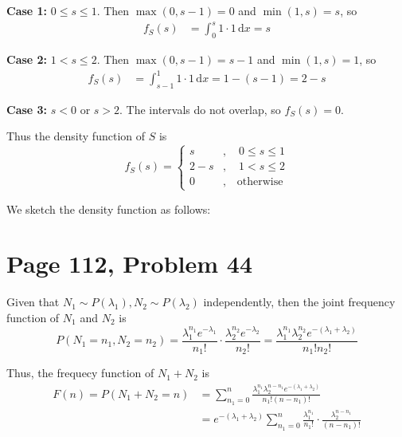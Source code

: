 \documentclass[a4paper, UTF-8]{article}
\theoremstyle{plain}
\begin{document}
\textbf{Case 1:} $0 \leq s \leq 1$. Then $\max(0, s-1) = 0$ and $\min(1, s) = s$, so
\begin{align*}
f_S(s) &= \int_{0}^{s} 1 \cdot 1 \, \mathrm{d}x = s
\end{align*}

\textbf{Case 2:} $1 < s \leq 2$. Then $\max(0, s-1) = s-1$ and $\min(1, s) = 1$, so
\begin{align*}
f_S(s) &= \int_{s-1}^{1} 1 \cdot 1 \, \mathrm{d}x = 1 - (s-1) = 2 - s
\end{align*}

\textbf{Case 3:} $s < 0$ or $s > 2$. The intervals do not overlap, so $f_S(s) = 0$.

Thus the density function of $S$ is
$$
f_S(s) = \begin{cases}
s &, \quad 0 \leq s \leq 1 \\
2 - s &, \quad 1 < s \leq 2 \\
0 &, \quad \text{otherwise}
\end{cases}
$$

We sketch the density function as follows:

\begin{center}
\end{center}

\section{Page 112, Problem 44}

Given that $N_1 \sim P(\lambda_1), N_2 \sim P(\lambda_2)$ independently, then the joint frequency function of $N_1$ and $N_2$ is
$$
P(N_1 = n_1, N_2 = n_2) = \frac{\lambda_1^{n_1}e^{-\lambda_1}}{n_1!} \cdot \frac{\lambda_2^{n_2}e^{-\lambda_2}}{n_2!} = \frac{\lambda_1^{n_1}\lambda_2^{n_2}e^{-(\lambda_1 + \lambda_2)}}{n_1! n_2!}
$$

Thus, the frequecy function of $N_1 + N_2$ is
\begin{align*}
F(n) = P(N_1 + N_2 = n) &= \sum_{n_1 = 0}^n \frac{\lambda_1^{n_1}\lambda_2^{n - n_1}e^{-(\lambda_1 + \lambda_2)}}{n_1! (n-n_1)!} \\ 
&= e^{-(\lambda_1 + \lambda_2)} \sum_{n_1 = 0}^n  \frac{\lambda_1^{n_1}}{n_1!} \cdot \frac{\lambda_2^{n - n_1}}{(n - n_1)!}
\end{align*}
\end{document}

